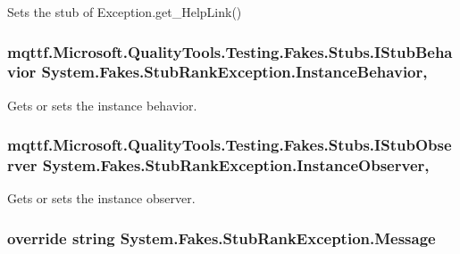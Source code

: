 Sets the stub of Exception.\-get\-\_\-\-Help\-Link()

\hypertarget{class_system_1_1_fakes_1_1_stub_rank_exception_a8b845f3ecb13d4f8af4157566edfe86f}{
\subsubsection[{Instance\-Behavior}]{\setlength{\rightskip}{0pt plus 5cm}mqttf.\-Microsoft.\-Quality\-Tools.\-Testing.\-Fakes.\-Stubs.\-I\-Stub\-Behavior System.\-Fakes.\-Stub\-Rank\-Exception.\-Instance\-Behavior\hspace{0.3cm}{\ttfamily [get]}, {\ttfamily [set]}}}\label{class_system_1_1_fakes_1_1_stub_rank_exception_a8b845f3ecb13d4f8af4157566edfe86f}


Gets or sets the instance behavior.

\hypertarget{class_system_1_1_fakes_1_1_stub_rank_exception_a19cbe3fffe99abc8eee054a55d8e63e8}{
\subsubsection[{Instance\-Observer}]{\setlength{\rightskip}{0pt plus 5cm}mqttf.\-Microsoft.\-Quality\-Tools.\-Testing.\-Fakes.\-Stubs.\-I\-Stub\-Observer System.\-Fakes.\-Stub\-Rank\-Exception.\-Instance\-Observer\hspace{0.3cm}{\ttfamily [get]}, {\ttfamily [set]}}}\label{class_system_1_1_fakes_1_1_stub_rank_exception_a19cbe3fffe99abc8eee054a55d8e63e8}


Gets or sets the instance observer.

\hypertarget{class_system_1_1_fakes_1_1_stub_rank_exception_a07fb0ca6f9ef90f2592f8c24365c2a26}{
\subsubsection[{Message}]{\setlength{\rightskip}{0pt plus 5cm}override string System.\-Fakes.\-Stub\-Rank\-Exception.\-Message\hspace{0.3cm}{\ttfamily [get]}}}\label{class_system_1_1_fakes_1_1_stub_rank_exception_a07fb0ca6f9ef90f2592f8c24365c2a26}


